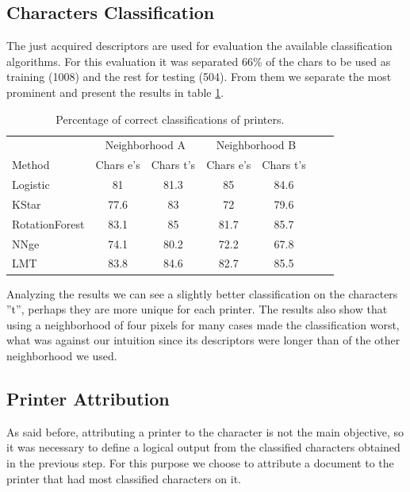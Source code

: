 \documentclass[10pt,twocolumn,letterpaper]{article}
\begin{document}
\subsection{Characters Classification}

The just acquired descriptors are used for evaluation the available classification algorithms. For this evaluation it was separated 66\% of the chars to be used as training (1008) and the rest for testing (504). From them we separate the most prominent and present the results in table \ref{tab:correct_classification}.

\begin{table}
\label{tab:correct_classification}
\caption{Percentage of correct classifications of printers.}
\begin{center}
\begin{small} 
\setlength{\tabcolsep}{3pt} 
\begin{tabular}{l*{5}{c}r} & \multicolumn{2}{c}{Neighborhood A} & \multicolumn{2}{c}{Neighborhood B}\\ \cline{1-5}
Method & Chars e’s & Chars t’s & Chars e’s & Chars t’s \\
\hline
Logistic & 81 & 81.3 & 85 & 84.6\\
KStar & 77.6 & 83 & 72 & 79.6\\
RotationForest & 83.1 & 85 & 81.7 & 85.7\\
NNge & 74.1 & 80.2 & 72.2 & 67.8\\
LMT & 83.8 & 84.6 & 82.7 & 85.5\\

\end{tabular}
\end{small}
\end{center}
\end{table}

Analyzing the results we can see a slightly better classification on the characters ''t'', perhaps they are more unique for each printer. The results also show that using a neighborhood of four pixels for many cases made the classification worst, what was against our intuition since its descriptors were longer than of the other neighborhood we used.

\subsection{Printer Attribution}

As said before, attributing a printer to the character is not the main objective, so it was necessary to define a logical output from the classified characters obtained in the previous step. For this purpose we choose to attribute a document to the printer that had most classified characters on it.
\end{document}
